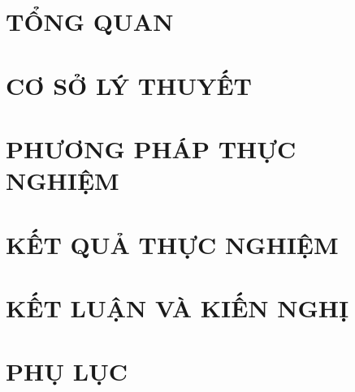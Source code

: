 \documentclass[13pt,a4paper]{report}
\begin{document}


\newpage
\vspace*{2.5cm}

\newpage
\vspace*{2.5cm}

\newpage
\vspace*{2.5cm}

\tableofcontents %
\listoftables %
\listoffigures %

\chapter{TỔNG QUAN} 
    
    
    
    
    
    
    

\chapter{CƠ SỞ LÝ THUYẾT}
    
    
    \newpage
    
    
    
\chapter{PHƯƠNG PHÁP THỰC NGHIỆM}
    
    
\chapter{KẾT QUẢ THỰC NGHIỆM}
    
    
\chapter{KẾT LUẬN VÀ KIẾN NGHỊ}
    
    
\newpage
\printbibliography[heading=bibintoc,title={\textcolor{blue}{Tài liệu tham khảo}}]

\appendix
\chapter*{PHỤ LỤC}

\end{document}
